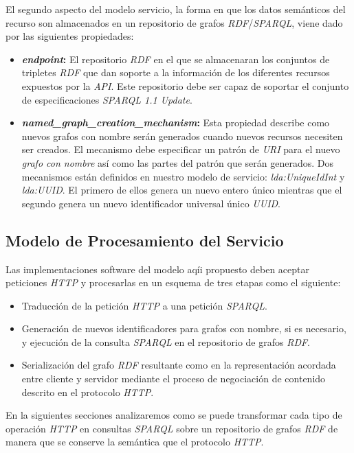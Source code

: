 El segundo aspecto del modelo servicio, la forma en que los datos sem\'anticos del recurso son almacenados en un repositorio de grafos \textit{RDF}/\textit{SPARQL}, viene dado por las siguientes propiedades:

\begin{itemize}
\item \textbf{\textit{endpoint}:} El repositorio \textit{RDF} en el que se almacenaran los conjuntos de tripletes \textit{RDF} que dan soporte a la informaci\'on de los diferentes recursos expuestos por la \textit{API}. Este repositorio debe ser capaz de soportar el conjunto de especificaciones \textit{SPARQL 1.1 Update}.
\item \textbf{\textit{named\_graph\_creation\_mechanism}:} Esta propiedad describe como nuevos grafos con nombre ser\'an generados cuando nuevos recursos necesiten ser creados. El mecanismo debe especificar un patr\'on de \textit{URI} para el nuevo \textit{grafo con nombre} as\'i como las partes del patr\'on que ser\'an generados. Dos mecanismos est\'an definidos en nuestro modelo de servicio: \textit{lda:UniqueIdInt} y \textit{lda:UUID}. El primero de ellos genera un nuevo entero \'unico mientras que el segundo genera un nuevo identificador universal \'unico \textit{UUID}.
\end{itemize}

\subsection{Modelo de Procesamiento del Servicio}

Las implementaciones software del modelo aq\'ii propuesto deben aceptar peticiones \textit{HTTP} y procesarlas en un esquema de tres etapas como el siguiente:\

\begin{itemize}
\item Traducci\'on de la petici\'on \textit{HTTP} a una petici\'on \textit{SPARQL}.
\item Generaci\'on de nuevos identificadores para grafos con nombre, si es necesario, y ejecuci\'on de la consulta \textit{SPARQL} en el repositorio de grafos \textit{RDF}.
\item Serializaci\'on del grafo \textit{RDF} resultante como en la representaci\'on acordada entre cliente y servidor mediante el proceso de negociaci\'on de contenido descrito en el protocolo \textit{HTTP}.
\end{itemize}

En la siguientes secciones analizaremos como se puede transformar cada tipo de operaci\'on \textit{HTTP} en consultas \textit{SPARQL} sobre un repositorio de grafos \textit{RDF} de manera que se conserve la sem\'antica que el protocolo \textit{HTTP}.

